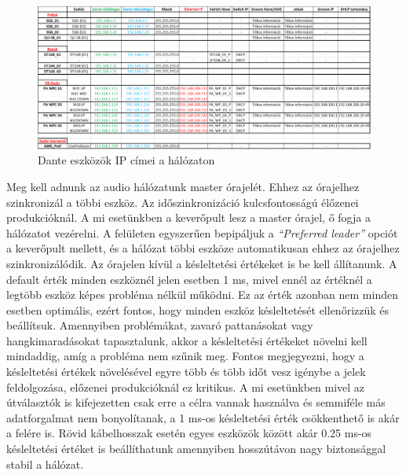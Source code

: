 \begin{figure}[H]
	\centering
	\includegraphics[width=\textwidth, keepaspectratio]{figures/dante_ips.png}
	\caption{Dante eszközök IP címei a hálózaton}\label{fig:dante_ips}
\end{figure}
Meg kell adnunk az audio hálózatunk master órajelét. Ehhez az órajelhez
szinkronizál a többi eszköz.
Az időszinkronizáció kulcsfontosságú élőzenei produkcióknál.
A mi esetünkben a keverőpult lesz a master órajel, ő fogja a hálózatot
vezérelni. A felületen egyszerűen bepipáljuk a \textit{``Preferred leader''} opciót
a keverőpult mellett, és a hálózat többi eszköze automatikusan ehhez az órajelhez szinkronizálódik.
Az órajelen kívül a késleltetési értékeket is be kell állítanunk. A default érték minden eszköznél jelen esetben
1 ms, mivel ennél az értéknél a legtöbb eszköz képes probléma nélkül működni. Ez az érték azonban
nem minden esetben optimális, ezért fontos, hogy minden eszköz késleltetését ellenőrizzük és beállítsuk.
Amennyiben problémákat, zavaró pattanásokat vagy hangkimaradásokat tapasztalunk, akkor a késleltetési értékeket
növelni kell mindaddig, amíg a probléma nem szűnik meg. Fontos megjegyezni, hogy a késleltetési értékek
növelésével egyre több és több időt vesz igénybe a jelek feldolgozása, előzenei produkcióknál ez kritikus.
A mi esetünkben mivel az útválasztók is kifejezetten csak erre a célra vannak használva és semmiféle más
adatforgalmat nem bonyolítanak, a 1 ms-os késleltetési érték csökkenthető is akár a felére is.
Rövid kábelhosszak esetén egyes eszközök között akár 0.25 ms-os késleltetési értéket is beállíthatunk amennyiben
hosszútávon nagy biztonsággal stabil a hálózat.
